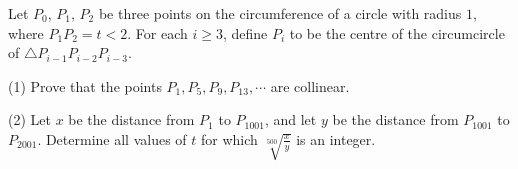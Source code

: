 Let $P_0$,  $P_1$,  $P_2$ be three points on the circumference of a circle with radius $1$,  where $P_1P_2 = t < 2$. For each $i \ge 3$,  define $P_i$ to be the centre of the circumcircle of $\triangle P_{i-1} P_{i-2} P_{i-3}$.

(1)  Prove that the points $P_1, P_5, P_9, P_{13},\cdots$ are collinear.

(2)  Let $x$ be the distance from $P_1$ to $P_{1001}$,  and let $y$ be the distance from $P_{1001}$ to $P_{2001}$. Determine all values of $t$ for which $\sqrt[500]{ \frac xy}$ is an integer.
